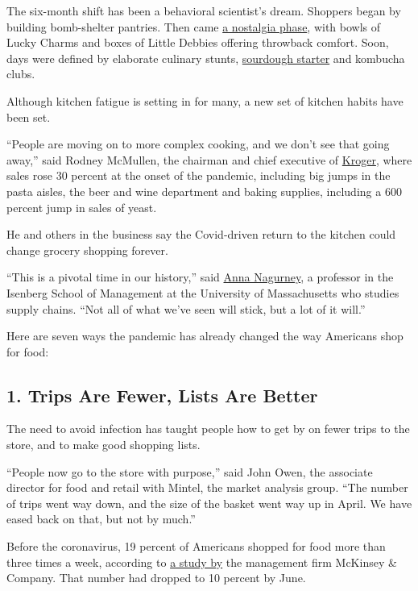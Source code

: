 The six-month shift has been a behavioral scientist's dream. Shoppers
began by building bomb-shelter pantries. Then came
\href{https://www.nytimes3xbfgragh.onion/2020/04/07/business/coronavirus-processed-foods.html}{a
nostalgia phase}, with bowls of Lucky Charms and boxes of Little Debbies
offering throwback comfort. Soon, days were defined by elaborate
culinary stunts,
\href{https://www.nytimes3xbfgragh.onion/2020/03/30/style/bread-baking-coronavirus.html}{sourdough
starter} and kombucha clubs.

Although kitchen fatigue is setting in for many, a new set of kitchen
habits have been set.

``People are moving on to more complex cooking, and we don't see that
going away,'' said Rodney McMullen, the chairman and chief executive of
\href{https://www.kroger.com/}{Kroger}, where sales rose 30 percent at
the onset of the pandemic, including big jumps in the pasta aisles, the
beer and wine department and baking supplies, including a 600 percent
jump in sales of yeast.

He and others in the business say the Covid-driven return to the kitchen
could change grocery shopping forever.

``This is a pivotal time in our history,'' said
\href{https://people.umass.edu/nagurney/}{Anna Nagurney}, a professor in
the Isenberg School of Management at the University of Massachusetts who
studies supply chains. ``Not all of what we've seen will stick, but a
lot of it will.''

Here are seven ways the pandemic has already changed the way Americans
shop for food:

\hypertarget{1-trips-are-fewer-lists-are-better}{%
\subsection{1. Trips Are Fewer, Lists Are
Better}\label{1-trips-are-fewer-lists-are-better}}

The need to avoid infection has taught people how to get by on fewer
trips to the store, and to make good shopping lists.

``People now go to the store with purpose,'' said John Owen, the
associate director for food and retail with Mintel, the market analysis
group. ``The number of trips went way down, and the size of the basket
went way up in April. We have eased back on that, but not by much.''

Before the coronavirus, 19 percent of Americans shopped for food more
than three times a week, according to
\href{https://www.mckinsey.com/featured-insights/coronavirus-leading-through-the-crisis/charting-the-path-to-the-next-normal/some-changes-to-grocery-shopping-habits-likely-to-stick-after-the-crisis}{a
study by} the management firm McKinsey \& Company. That number had
dropped to 10 percent by June.

